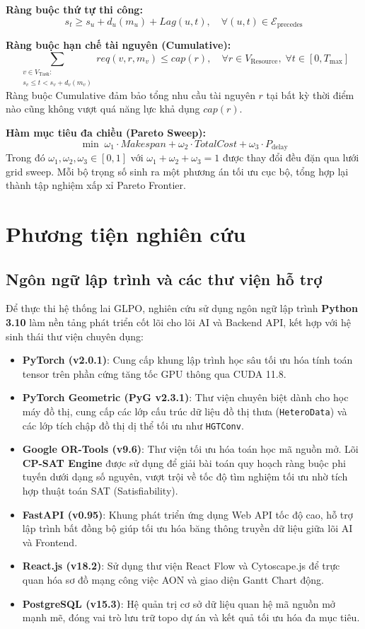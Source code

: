 \textbf{Ràng buộc thứ tự thi công:}
$$s_t \geq s_u + d_u(m_u) + Lag(u, t), \quad \forall (u, t) \in \mathcal{E}_{\text{precedes}}$$

\textbf{Ràng buộc hạn chế tài nguyên (Cumulative):}
$$\sum_{\substack{v \in V_{\text{Task}}:\\ s_v \leq t < s_v + d_v(m_v)}} req(v, r, m_v) \leq cap(r), \quad \forall r \in V_{\text{Resource}}, \; \forall t \in [0, T_{\max}]$$
Ràng buộc Cumulative đảm bảo tổng nhu cầu tài nguyên $r$ tại bất kỳ thời điểm nào cũng không vượt quá năng lực khả dụng $cap(r)$.

\textbf{Hàm mục tiêu đa chiều (Pareto Sweep):}
$$\min \; \omega_1 \cdot Makespan + \omega_2 \cdot TotalCost + \omega_3 \cdot P_{\text{delay}}$$
Trong đó $\omega_1, \omega_2, \omega_3 \in [0, 1]$ với $\omega_1 + \omega_2 + \omega_3 = 1$ được thay đổi đều đặn qua lưới grid sweep. Mỗi bộ trọng số sinh ra một phương án tối ưu cục bộ, tổng hợp lại thành tập nghiệm xấp xỉ Pareto Frontier.

\section{Phương tiện nghiên cứu}
\label{sec:2.2_research_tools}

\subsection{Ngôn ngữ lập trình và các thư viện hỗ trợ}
Để thực thi hệ thống lai GLPO, nghiên cứu sử dụng ngôn ngữ lập trình \textbf{Python 3.10} làm nền tảng phát triển cốt lõi cho lõi AI và Backend API, kết hợp với hệ sinh thái thư viện chuyên dụng:
\begin{itemize}
    \item \textbf{PyTorch (v2.0.1)}: Cung cấp khung lập trình học sâu tối ưu hóa tính toán tensor trên phần cứng tăng tốc GPU thông qua CUDA 11.8.
    \item \textbf{PyTorch Geometric (PyG v2.3.1)}: Thư viện chuyên biệt dành cho học máy đồ thị, cung cấp các lớp cấu trúc dữ liệu đồ thị thưa (\texttt{HeteroData}) và các lớp tích chập đồ thị dị thể tối ưu như \texttt{HGTConv}.
    \item \textbf{Google OR-Tools (v9.6)}: Thư viện tối ưu hóa toán học mã nguồn mở. Lõi \textbf{CP-SAT Engine} được sử dụng để giải bài toán quy hoạch ràng buộc phi tuyến dưới dạng số nguyên, vượt trội về tốc độ tìm nghiệm tối ưu nhờ tích hợp thuật toán SAT (Satisfiability).
    \item \textbf{FastAPI (v0.95)}: Khung phát triển ứng dụng Web API tốc độ cao, hỗ trợ lập trình bất đồng bộ giúp tối ưu hóa băng thông truyền dữ liệu giữa lõi AI và Frontend.
    \item \textbf{React.js (v18.2)}: Sử dụng thư viện React Flow và Cytoscape.js để trực quan hóa sơ đồ mạng công việc AON và giao diện Gantt Chart động.
    \item \textbf{PostgreSQL (v15.3)}: Hệ quản trị cơ sở dữ liệu quan hệ mã nguồn mở mạnh mẽ, đóng vai trò lưu trữ topo dự án và kết quả tối ưu hóa đa mục tiêu.
\end{itemize}

